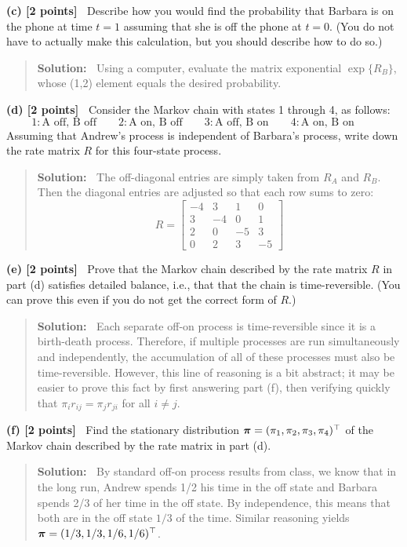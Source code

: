 \documentclass{article}
\newcommand{\svskip}{\vspace{.2in}}
\def\vec#1{\mathchoice{\mbox{\boldmath$\displaystyle\bf#1$}}
{\mbox{\boldmath$\textstyle\bf#1$}}
{\mbox{\boldmath$\scriptstyle\bf#1$}}
{\mbox{\boldmath$\scriptscriptstyle\bf#1$}}}
\begin{document}
\svskip
{\bf(c) [2 points]\ }
Describe how you would find the probability that Barbara is on the phone at time $t=1$ assuming that she is off the phone at $t=0$.
(You do not have to actually make this calculation, but you should describe how to do so.)
\begin{quotation}{\bf Solution:\ }
Using a computer, evaluate the matrix exponential $\exp\{R_B\}$, whose (1,2) element equals
the desired probability.
\end{quotation}

\svskip
{\bf(d) [2 points]\ }
Consider the Markov chain with states 1 through 4, as follows:
\[
1: \mbox{A off, B off} \qquad
2: \mbox{A on, B off} \qquad
3: \mbox{A off, B on} \qquad
4: \mbox{A on, B on} \qquad
\]
Assuming that Andrew's process is independent of Barbara's process,
write down the rate matrix $R$ for this four-state process.
\begin{quotation}{\bf Solution:\ }
The off-diagonal entries are simply taken from $R_A$ and $R_B$.  Then the diagonal 
entries are adjusted so that each row sums to zero:
\[
R=\begin{bmatrix}
-4 & 3 & 1 & 0 \\
3 & -4 & 0 & 1 \\
2 & 0 & -5 & 3 \\
0 & 2 & 3 & -5
\end{bmatrix}
\]
\end{quotation}

\svskip
{\bf(e) [2 points]\ }
Prove that the Markov chain described by the rate matrix $R$ in part (d) 
satisfies detailed balance, i.e., that that the chain is time-reversible.  
(You can prove this even if you do not get the correct
form of $R$.)
\begin{quotation}{\bf Solution:\ }
Each separate off-on process is time-reversible since it is a birth-death process.  Therefore,
if multiple processes are run simultaneously and independently, the accumulation of all of these
processes must also be time-reversible.  However, this line of reasoning is a bit abstract; it may
be easier to prove this fact by first answering part (f), then verifying quickly that $\pi_i r_{ij}=
\pi_j r_{ji}$ for all $i\ne j$.  
\end{quotation}

\svskip
{\bf(f) [2 points]\ }
Find the stationary distribution $\vec \pi=(\pi_1, \pi_2, \pi_3, \pi_4)^\top$ of the Markov chain
described by the rate matrix in part (d).
\begin{quotation}{\bf Solution:\ }
By standard off-on process results from class, we know that in the long run, Andrew spends
1/2 his time in the off state and Barbara spends 2/3 of her time in the off state. By
independence, this means that both are in the off state $1/3$ of the time.  Similar reasoning
yields $\vec\pi=(1/3, 1/3, 1/6, 1/6)^\top$.  
\end{quotation}
\end{document}

